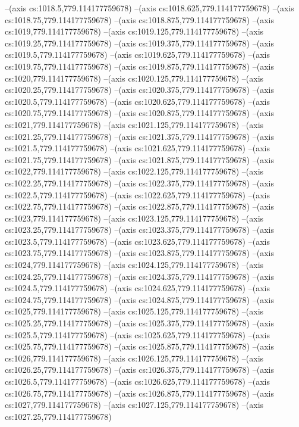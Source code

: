--(axis cs:1018.5,779.114177759678)
--(axis cs:1018.625,779.114177759678)
--(axis cs:1018.75,779.114177759678)
--(axis cs:1018.875,779.114177759678)
--(axis cs:1019,779.114177759678)
--(axis cs:1019.125,779.114177759678)
--(axis cs:1019.25,779.114177759678)
--(axis cs:1019.375,779.114177759678)
--(axis cs:1019.5,779.114177759678)
--(axis cs:1019.625,779.114177759678)
--(axis cs:1019.75,779.114177759678)
--(axis cs:1019.875,779.114177759678)
--(axis cs:1020,779.114177759678)
--(axis cs:1020.125,779.114177759678)
--(axis cs:1020.25,779.114177759678)
--(axis cs:1020.375,779.114177759678)
--(axis cs:1020.5,779.114177759678)
--(axis cs:1020.625,779.114177759678)
--(axis cs:1020.75,779.114177759678)
--(axis cs:1020.875,779.114177759678)
--(axis cs:1021,779.114177759678)
--(axis cs:1021.125,779.114177759678)
--(axis cs:1021.25,779.114177759678)
--(axis cs:1021.375,779.114177759678)
--(axis cs:1021.5,779.114177759678)
--(axis cs:1021.625,779.114177759678)
--(axis cs:1021.75,779.114177759678)
--(axis cs:1021.875,779.114177759678)
--(axis cs:1022,779.114177759678)
--(axis cs:1022.125,779.114177759678)
--(axis cs:1022.25,779.114177759678)
--(axis cs:1022.375,779.114177759678)
--(axis cs:1022.5,779.114177759678)
--(axis cs:1022.625,779.114177759678)
--(axis cs:1022.75,779.114177759678)
--(axis cs:1022.875,779.114177759678)
--(axis cs:1023,779.114177759678)
--(axis cs:1023.125,779.114177759678)
--(axis cs:1023.25,779.114177759678)
--(axis cs:1023.375,779.114177759678)
--(axis cs:1023.5,779.114177759678)
--(axis cs:1023.625,779.114177759678)
--(axis cs:1023.75,779.114177759678)
--(axis cs:1023.875,779.114177759678)
--(axis cs:1024,779.114177759678)
--(axis cs:1024.125,779.114177759678)
--(axis cs:1024.25,779.114177759678)
--(axis cs:1024.375,779.114177759678)
--(axis cs:1024.5,779.114177759678)
--(axis cs:1024.625,779.114177759678)
--(axis cs:1024.75,779.114177759678)
--(axis cs:1024.875,779.114177759678)
--(axis cs:1025,779.114177759678)
--(axis cs:1025.125,779.114177759678)
--(axis cs:1025.25,779.114177759678)
--(axis cs:1025.375,779.114177759678)
--(axis cs:1025.5,779.114177759678)
--(axis cs:1025.625,779.114177759678)
--(axis cs:1025.75,779.114177759678)
--(axis cs:1025.875,779.114177759678)
--(axis cs:1026,779.114177759678)
--(axis cs:1026.125,779.114177759678)
--(axis cs:1026.25,779.114177759678)
--(axis cs:1026.375,779.114177759678)
--(axis cs:1026.5,779.114177759678)
--(axis cs:1026.625,779.114177759678)
--(axis cs:1026.75,779.114177759678)
--(axis cs:1026.875,779.114177759678)
--(axis cs:1027,779.114177759678)
--(axis cs:1027.125,779.114177759678)
--(axis cs:1027.25,779.114177759678)
